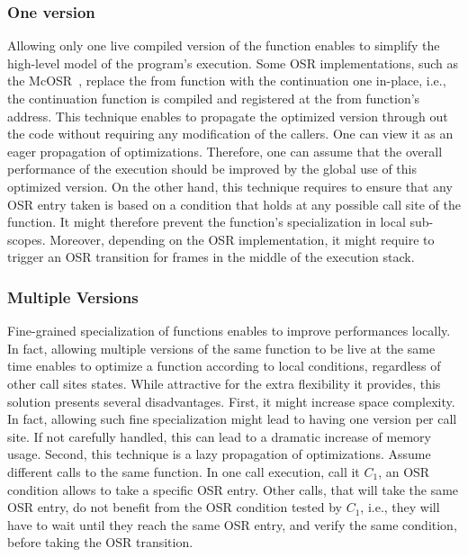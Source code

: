 \subsubsection{One version}
Allowing only one live compiled version of the function enables to simplify the high-level model of the program's execution.
Some OSR implementations, such as the McOSR~\cite{lameed2013modular}, replace the from function with the continuation one in-place, i.e., the continuation function is compiled and registered at the from function's address.
This technique enables to propagate the optimized version through out the code without requiring any modification of the callers.
One can view it as an eager propagation of optimizations.
Therefore, one can assume that the overall performance of the execution should be improved by the global use of this optimized version.
On the other hand, this technique requires to ensure that any OSR entry taken is based on a condition that holds at any possible call site of the function.
It might therefore prevent the function's specialization in local sub-scopes.
Moreover, depending on the OSR implementation, it might require to trigger an OSR transition for frames in the middle of the execution stack.
\\


\subsubsection{Multiple Versions}
Fine-grained specialization of functions enables to improve performances locally.
In fact, allowing multiple versions of the same function to be live at the same time enables to optimize a function according to local conditions, regardless of other call sites states.
While attractive for the extra flexibility it provides, this solution presents several disadvantages.
First, it might increase space complexity.
In fact, allowing such fine specialization might lead to having one version per call site.
If not carefully handled, this can lead to a dramatic increase of memory usage.
Second, this technique is a lazy propagation of optimizations.
Assume different calls to the same function.
In one call execution, call it $C_1$, an OSR condition allows to take a specific OSR entry.
Other calls, that will take the same OSR entry, do not benefit from the OSR condition tested by $C_1$, i.e., they will have to wait until they reach the same OSR entry, and verify the same condition, before taking the OSR transition.



